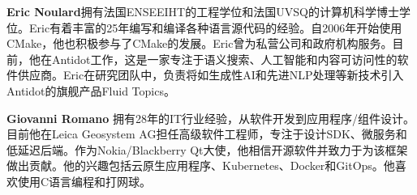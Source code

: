 \textbf{Eric Noulard}拥有法国ENSEEIHT的工程学位和法国UVSQ的计算机科学博士学位。Eric有着丰富的25年编写和编译各种语言源代码的经验。自2006年开始使用CMake，他也积极参与了CMake的发展。Eric曾为私营公司和政府机构服务。目前，他在Antidot工作，这是一家专注于语义搜索、人工智能和内容可访问性的软件供应商。Eric在研究团队中，负责将如生成性AI和先进NLP处理等新技术引入Antidot的旗舰产品Fluid Topics。

\hspace*{\fill}
\hspace*{\fill}

\textbf{Giovanni Romano} 拥有28年的IT行业经验，从软件开发到应用程序/组件设计。目前他在Leica Geosystem AG担任高级软件工程师，专注于设计SDK、微服务和低延迟后端。作为Nokia/Blackberry Qt大使，他相信开源软件并致力于为该框架做出贡献。他的兴趣包括云原生应用程序、Kubernetes、Docker和GitOps。他喜欢使用C语言编程和打网球。

